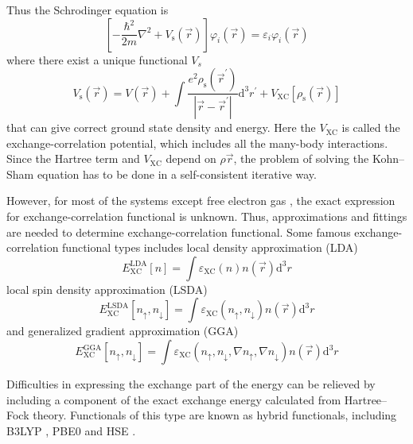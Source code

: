 Thus the Schrodinger equation is 
\begin{equation}
\left[-\frac{\hbar^{2}}{2 m} \nabla^{2}+V_{\mathrm{s}}(\vec{r})\right] \varphi_{i}(\vec{r})=\varepsilon_{i} \varphi_{i}(\vec{r})
\end{equation}
where there exist a unique functional $V_s$
\begin{equation}
V_{\mathrm{s}}(\vec{r})=V(\vec{r})+\int \frac{e^{2} \rho_{\mathrm{s}}\left(\vec{r}^{\prime}\right)}{\left|\vec{r}-\vec{r}^{\prime}\right|} \mathrm{d}^{3} r^{\prime}+V_{\mathrm{XC}}\left[\rho_{\mathrm{s}}(\vec{r})\right]
\end{equation}
that can give correct ground state density and energy.
Here the $V_{\mathrm{XC}}$ is called the exchange-correlation potential, which includes all the many-body interactions.
Since the Hartree term and $V_{\mathrm{XC}}$ depend on $\rho{\vec{r}}$, the problem of solving the Kohn–Sham equation has to be done in a self-consistent iterative way.

However, for most of the systems except free electron gas \cite{homogeneous}, the exact expression for exchange-correlation functional is unknown.
Thus, approximations and fittings are needed to determine exchange-correlation functional.
Some famous exchange-correlation functional types includes local density approximation (LDA)
\begin{equation}
E_{\mathrm{XC}}^{\mathrm{LDA}}[n]=\int \varepsilon_{\mathrm{XC}}(n) n(\vec{r}) \mathrm{d}^{3} r
\end{equation}
local spin density approximation (LSDA) 
\begin{equation}
E_{\mathrm{XC}}^{\mathrm{LSDA}}\left[n_{\uparrow}, n_{\downarrow}\right]=\int \varepsilon_{\mathrm{XC}}\left(n_{\uparrow}, n_{\downarrow}\right) n(\vec{r}) \mathrm{d}^{3} r
\end{equation}
and generalized gradient approximation (GGA)
\begin{equation}
E_{\mathrm{XC}}^{\mathrm{GGA}}\left[n_{\uparrow}, n_{\downarrow}\right]=\int \varepsilon_{\mathrm{XC}}\left(n_{\uparrow}, n_{\downarrow}, \nabla n_{\uparrow}, \nabla n_{\downarrow}\right) n(\vec{r}) \mathrm{d}^{3} r
\end{equation}

Difficulties in expressing the exchange part of the energy can be relieved by including a component of the exact exchange energy calculated from Hartree–Fock theory.
Functionals of this type are known as hybrid functionals, including B3LYP \cite{b3lyp}, PBE0 \cite{pbe0} and HSE \cite{hse}.

